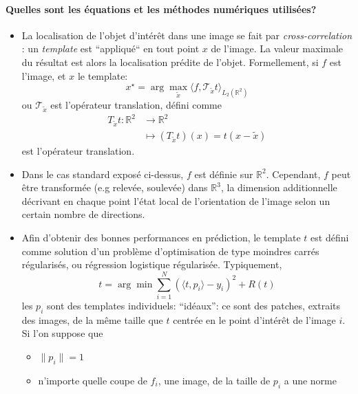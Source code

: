 \documentclass{article}
\begin{document}
\paragraph{Quelles sont les équations et les méthodes numériques utilisées?} 
\begin{itemize}
    \item La localisation de l'objet d'intérêt dans une image se fait par
      \emph{cross-correlation} \cite{cross-correlation}: un
        \emph{template} est ``appliqué`` en tout point $ x $ de l'image.  La valeur
        maximale du résultat est alors la localisation prédite de l'objet. Formellement,
        si $ f $ est l'image, et $ x $ le template:
      \[
      {x}^{\star} = \arg \max_{ \tilde{ x } } \langle  f, \mathcal  T_{ \tilde{ x }}
      t\rangle_{L_2(\mathbb{R}^2)}
      \] 
      ou $ \mathcal  T_{ \tilde{ x }}$  est l'opérateur translation, défini comme
      \[
      \begin{aligned}
        T_{ \tilde{ x }}t:  \mathbb{R}^2 &\longrightarrow \mathbb{R}^2 \\
                                         &\longmapsto \left ( T_{ \tilde{ x }}t \right )(x) = t( x - \tilde{ x })
      \end{aligned}
      \] 
       est l'opérateur translation.
    \item Dans le cas standard exposé ci-dessus, $ f $ est définie sur $ \mathbb{R}^2 $. Cependant, $ f $
        peut être transformée (e.g relevée, soulevée) dans $ \mathbb{R}^3 $, la dimension
        additionnelle décrivant en chaque point l'état local de l'orientation de l'image
        selon un certain nombre de directions.
    \item Afin d'obtenir des bonnes performances en prédiction, le template $ t $ est
      défini comme solution d'un problème d'optimisation de type
        moindres carrés régularisés, ou régression logistique régularisée.
        Typiquement,
        \[
        t = \arg \min_{  } \sum\limits_{ i=1 }^{ N } \left ( \langle t, p_i \rangle
        - y_i \right )^2 + R(t) 
        \] 
        les $ p_i $ sont des templates individuels: ``idéaux'': ce sont des patches,
        extraits des images, de la même taille que $ t $ centrée en le point d'intérêt
        de l'image $ i $. Si l'on suppose que 
        \begin{itemize}
            \item $ \|p_i\| = 1 $
            \item n'importe quelle coupe de $ f_i $, une image, de la taille de $ p_i $ a une norme

\end{itemize}
\end{itemize}
\end{document}

